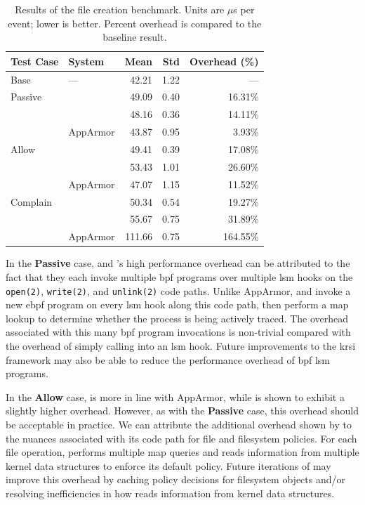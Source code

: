 \begingroup\small
\begin{longtable}[c]{llrrr}
  \caption[Results of the file creation benchmark]{
    Results of the file creation benchmark. Units are $\mu$s per event; lower is
    better. Percent overhead is compared to the baseline result.
  }%
  \label{tab:phoronix-files}\\
  \toprule
   Test Case & System         &  Mean  & Std & Overhead (\%)\\
   \midrule
   Base      & ---            &  42.21 & 1.22 &  ---     \\
   \midrule
   Passive   & \bpfbox{}      &  49.09 & 0.40 &  16.31\% \\
             & \bpfcontain{}  &  48.16 & 0.36 &  14.11\% \\
             & AppArmor       &  43.87 & 0.95 &   3.93\% \\
   \midrule
   Allow     & \bpfbox{}      &  49.41 & 0.39 &  17.08\% \\
             & \bpfcontain{}  &  53.43 & 1.01 &  26.60\% \\
             & AppArmor       &  47.07 & 1.15 &  11.52\% \\
   \midrule
   Complain  & \bpfbox{}      &  50.34 & 0.54 &  19.27\% \\
             & \bpfcontain{}  &  55.67 & 0.75 &  31.89\% \\
             & AppArmor       & 111.66 & 0.75 & 164.55\% \\
  \bottomrule
\end{longtable}
\endgroup

In the \textbf{Passive} case, \bpfbox{} and \bpfcontain{}'s high performance overhead can
be attributed to the fact that they each invoke multiple \gls{bpf} programs over multiple
\gls{lsm} hooks on the \texttt{open(2)}, \texttt{write(2)}, and \texttt{unlink(2)} code
paths. Unlike AppArmor, \bpfbox{} and \bpfcontain{} invoke a new \gls{ebpf} program on
every \gls{lsm} hook along this code path, then perform a map lookup to determine whether
the process is being actively traced. The overhead associated with this many \gls{bpf}
program invocations is non-trivial compared with the overhead of simply calling into an
\gls{lsm} hook. Future improvements to the \gls{krsi} framework may also be able to reduce
the performance overhead of \gls{bpf} \gls{lsm} programs.

In the \textbf{Allow} case, \bpfbox{} is more in line with AppArmor, while \bpfcontain{}
is shown to exhibit a slightly higher overhead. However, as with the \textbf{Passive}
case, this overhead should be acceptable in practice. We can attribute the additional
overhead shown by \bpfcontain{} to the nuances associated with its code path for file and
filesystem policies. For each file operation, \bpfcontain{} performs multiple map queries
and reads information from multiple kernel data structures to enforce its default policy.
Future iterations of \bpfcontain{} may improve this overhead by caching policy decisions
for filesystem objects and/or resolving inefficiencies in how \bpfcontain{} reads
information from kernel data structures.


